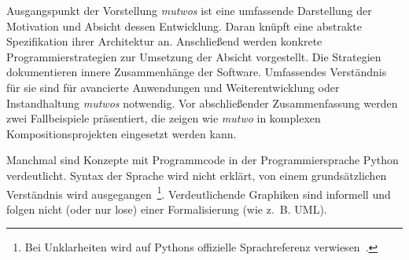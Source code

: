 \documentclass[12pt,a4paper,ngerman]{article}
\begin{document}
Ausgangspunkt der Vorstellung \emph{mutwos} ist eine umfassende Darstellung der Motivation und Absicht dessen Entwicklung.
Daran knüpft eine abstrakte Spezifikation ihrer Architektur an.
Anschließend werden konkrete Programmierstrategien zur Umsetzung der Absicht vorgestellt.
Die Strategien dokumentieren innere Zusammenhänge der Software.
Umfassendes Verständnis für sie sind für avancierte Anwendungen und Weiterentwicklung oder Instandhaltung \emph{mutwos} notwendig.
Vor abschließender Zusammenfassung werden zwei Fallbeispiele präsentiert, die zeigen wie \emph{mutwo} in komplexen Kompositionsprojekten eingesetzt werden kann.



\bigskip

Manchmal sind Konzepte mit Programmcode in der Programmiersprache Python verdeutlicht.
Syntax der Sprache wird nicht erklärt, von einem grundsätzlichen Verständnis wird ausgegangen~\footnote{%
    Bei Unklarheiten wird auf Pythons offizielle Sprachreferenz verwiesen~\parencite{pythonLanguageReference}.
}.
Verdeutlichende Graphiken sind informell und folgen nicht (oder nur lose) einer Formalisierung (wie z.~B. UML).


%


%

\end{document}
